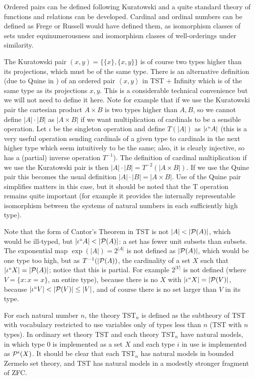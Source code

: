 \documentclass[112pt]{article}
\begin{document}
Ordered pairs can be defined following Kuratowski and a quite standard theory of functions and relations can be developed.  Cardinal and ordinal numbers can be defined as Frege or Russell would have defined them, as isomorphism classes of sets under equinumerousness and isomorphism classes of well-orderings under similarity.  

The Kuratowski pair $(x,y) = \{\{x\},\{x,y\}\}$ is of course two types higher than its projections, which must be of the same type.  There is an alternative definition (due to Quine in \cite{quinepair}) of an ordered pair
$\left< x,y\right>$ in TST + Infinity which is of the same type as its projections $x,y$.  This is a considerable technical convenience but we will not need to define it here.  Note for example that if we use the Kuratowski pair the cartesian product $A \times B$ is two types higher than $A,B$, so we cannot define $|A| \cdot |B|$ as $|A \times B|$ if we want multiplication of cardinals to be a sensible operation.  Let $\iota$ be the singleton operation and define $T(|A|)$ as $|\iota``A|$ (this is a very useful operation sending cardinals of a given type to cardinals in the next higher type which seem intuitively to be the same; also, it is clearly injective, so has a (partial) inverse operation $T^{-1}$).  The definition of cardinal multiplication if we use the Kuratowski pair is then $|A| \cdot |B| =T^{-2}(|A\times B|)$.  If we use the Quine pair this becomes the usual definition $|A| \cdot |B| =|A\times B|$.  Use of the Quine pair simplifies matters in this case, but it should be noted that the T operation remains quite important (for example it provides the internally representable isomorphism between the systems of natural numbers in each sufficiently high type).

Note that the form of Cantor's Theorem in TST is not $|A| < |{\cal P}(A)|$, which would be ill-typed, but $|\iota``A|<|{\cal P}(A)|$:  a set has fewer unit subsets than subsets.  The exponential map $\exp(|A|) = 2^{|A|}$ is not defined as $|{\cal P}(A)|$, which would be one type too high, but as $T^{-1}(|{\cal P}(A))$, the cardinality of a set $X$ such that $|\iota``X| = |{\cal P}(A)|$;   notice that this is partial.  For example
$2^{|V|}$ is not defined (where $V=\{x:x=x\}$, an entire type), because there is no $X$ with $|\iota``X|=|{\cal P}(V)|$, because $|\iota``V|<|{\cal P}(V)| \leq |V|$, and of course there is no set larger than $V$ in its type.

For each natural number $n$, the theory TST$_n$ is defined as the subtheory of TST with vocabulary restricted to use variables only of types less than $n$ (TST with $n$ types).
In ordinary set theory TST and each theory TST$_n$ have natural models, in which type 0 is implemented as a set $X$ and each type $i$ in use is implemented as ${\cal P}^i(X)$.  It should be clear that each TST$_n$ has natural models in bounded Zermelo set theory, and TST has natural models in a modestly stronger fragment of ZFC.
\end{document}
